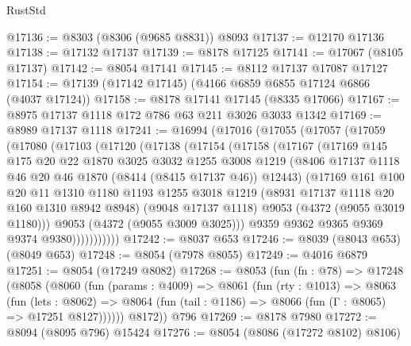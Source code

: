 \begin{lexlean}{RustStd}
\begin{coremodule}
@17136 := @8303 (@8306 (@9685 @8831)) @8093
@17137 := @12170 @17136
@17138 := @17132 @17137
@17139 := @8178 @17125
@17141 := @17067 (@8105 @17137)
@17142 := @8054 @17141
@17145 := @8112 @17137 @17087 @17127
@17154 := @17139 (@17142 @17145) (@4166 @6859 @6855 @17124 @6866 (@4037 @17124))
@17158 := @8178 @17141 @17145 (@8335 @17066)
@17167 := @8975 @17137 @1118 @172 @786 @63 @211 @3026 @3033 @1342
@17169 := @8989 @17137 @1118
@17241 := @16994
    (@17016
      (@17055
        (@17057
          (@17059
            (@17080
              (@17103
                (@17120
                  (@17138
                    (@17154
                      (@17158
                        (@17167
                          (@17169
                            @145
                            @175
                            @20
                            @22
                            @1870
                            @3025
                            @3032
                            @1255
                            @3008
                            @1219
                            (@8406 @17137 @1118 @46 @20 @46 @1870 (@8414 (@8415 @17137 @46)) @12443)
                            (@17169
                              @161
                              @100
                              @20
                              @11
                              @1310
                              @1180
                              @1193
                              @1255
                              @3018
                              @1219
                              (@8931 @17137 @1118 @20 @160 @1310 @8942 @8948)
                              (@9048 @17137 @1118)
                              @9053
                              (@4372 (@9055 @3019 @1180)))
                            @9053
                            (@4372 (@9055 @3009 @3025)))
                          @9359
                          @9362
                          @9365
                          @9369
                          @9374
                          @9380)))))))))))
@17242 := @8037 @653
@17246 := @8039 (@8043 @653) (@8049 @653)
@17248 := @8054 (@7978 @8055)
@17249 := @4016 @6879
@17251 := @8054 (@17249 @8082)
@17268 := @8053
    (fun (fn : @78) =>
    @17248
      (@8058
        (@8060
          (fun (params : @4009) =>
          @8061
            (fun (rty : @1013) =>
            @8063
              (fun (lets : @8062) =>
              @8064 (fun (tail : @1186) => @8066 (fun (Γ : @8065) => @17251 @8127))))))
        @8172))
    @796
@17269 := @8178 @7980
@17272 := @8094 (@8095 @796) @15424
@17276 := @8054 (@8086 (@17272 @8102) @8106)

\end{coremodule}
\end{lexlean}
